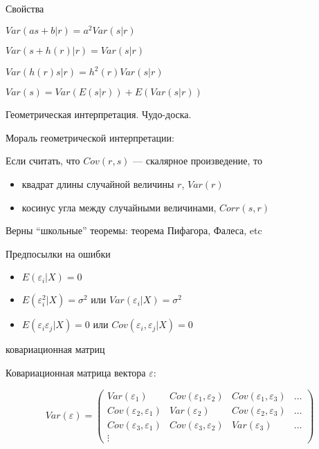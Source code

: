 \documentclass[ignorenonframetext,]{beamer}
\begin{document}
\begin{frame}{Свойства}

$Var(as+b|r)=a^2Var(s|r)$

$Var(s+h(r)|r)=Var(s|r)$

$Var(h(r)s|r)=h^2(r)Var(s|r)$

$Var(s)=Var(E(s|r))+E(Var(s|r))$

\end{frame}

\begin{frame}{Геометрическая интерпретация. Чудо-доска.}

\end{frame}

\begin{frame}{Мораль геометрической интерпретации:}

Если считать, что $Cov(r,s)$ --- скалярное произведение, то

\begin{itemize}
\item
  квадрат длины случайной величины $r$, $Var(r)$
\item
  косинус угла между случайными величинами, $Corr(s,r)$
\end{itemize}

Верны ``школьные'' теоремы: теорема Пифагора, Фалеса, etc

\end{frame}

\begin{frame}{Предпосылки на ошибки}

\begin{itemize}
\item
  $E(\varepsilon_i |X)=0$
\item
  $E(\varepsilon_i^2|X)=\sigma^2$ или $Var(\varepsilon_i|X)=\sigma^2$
\item
  $E(\varepsilon_i \varepsilon_j|X)=0$ или
  $Cov(\varepsilon_i,\varepsilon_j|X)=0$
\end{itemize}

\end{frame}

\begin{frame}{ковариационная матриц}

Ковариационная матрица вектора $\varepsilon$:

\[
Var(\varepsilon)=\begin{pmatrix}
Var(\varepsilon_1) & Cov(\varepsilon_1,\varepsilon_2) & Cov(\varepsilon_1,\varepsilon_3) & \ldots \\
Cov(\varepsilon_2,\varepsilon_1) & Var(\varepsilon_2) &  Cov(\varepsilon_2,\varepsilon_3) & \ldots \\
Cov(\varepsilon_3,\varepsilon_1) & Cov(\varepsilon_3,\varepsilon_2) & Var(\varepsilon_3) &   \ldots \\
\vdots & & 
\end{pmatrix}
\]

\end{frame}
\end{document}
